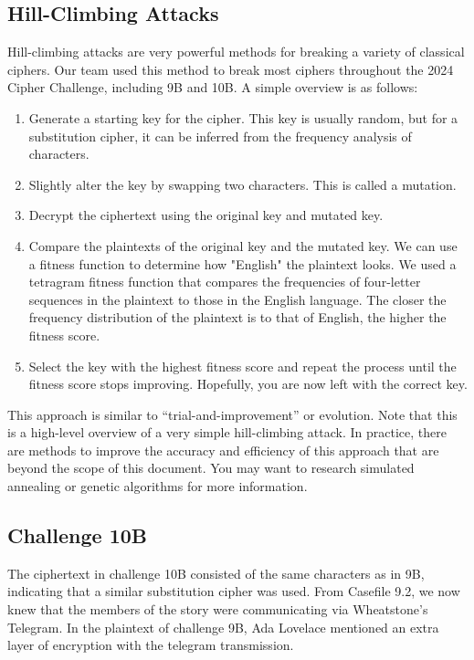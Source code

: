 \subsection*{Hill-Climbing Attacks}

Hill-climbing attacks are very powerful methods for breaking a variety of classical ciphers. Our team used this method to break most ciphers throughout the 2024 Cipher Challenge, including 9B and 10B. A simple overview is as follows:

\begin{enumerate}
    \item Generate a starting key for the cipher. This key is usually random, but for a substitution cipher, it can be inferred from the frequency analysis of characters.
    \item Slightly alter the key by swapping two characters. This is called a mutation.
    \item Decrypt the ciphertext using the original key and mutated key.
    \item Compare the plaintexts of the original key and the mutated key. We can use a fitness function to determine how "English" the plaintext looks. We used a tetragram fitness function that compares the frequencies of four-letter sequences in the plaintext to those in the English language. The closer the frequency distribution of the plaintext is to that of English, the higher the fitness score.
    \item Select the key with the highest fitness score and repeat the process until the fitness score stops improving. Hopefully, you are now left with the correct key.
\end{enumerate}

This approach is similar to \enquote{trial-and-improvement} or evolution. Note that this is a high-level overview of a very simple hill-climbing attack. In practice, there are methods to improve the accuracy and efficiency of this approach that are beyond the scope of this document. You may want to research simulated annealing or genetic algorithms for more information.

\subsection*{Challenge 10B}
The ciphertext in challenge 10B consisted of the same characters as in 9B, indicating that a similar substitution cipher was used. From Casefile 9.2, we now knew that the members of the story were communicating via Wheatstone's Telegram. In the plaintext of challenge 9B, Ada Lovelace mentioned an extra layer of encryption with the telegram transmission.

